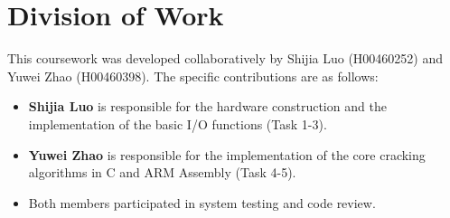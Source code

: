 \section{Division of Work}
\label{sec:work_division}

This coursework was developed collaboratively by Shijia Luo (H00460252) and Yuwei Zhao (H00460398). The specific contributions are as follows:

\begin{itemize}
    \item \textbf{Shijia Luo} is responsible for the hardware construction and the implementation of the basic I/O functions (Task 1-3).
    \item \textbf{Yuwei Zhao} is responsible for the implementation of the core cracking algorithms in C and ARM Assembly (Task 4-5).
    \item Both members participated in system testing and code review.
\end{itemize}
